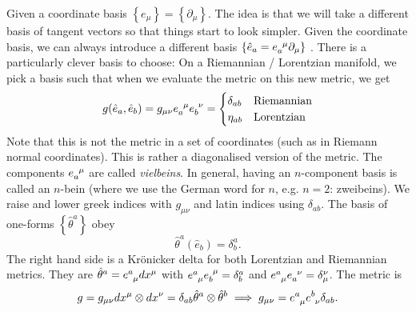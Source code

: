 Given a coordinate basis $\left\{ e_{\mu} \right\} = \left\{ \partial_{\mu} \right\}$.
The idea is that we will take a different basis of tangent vectors so that things start to look simpler.
Given the coordinate basis, we can always introduce a different basis $\left\{ \hat e_a = e \indices{_a^{\mu}} \partial_{\mu} \right\}$ .
There is a particularly clever basis to choose:
On a Riemannian / Lorentzian manifold, we pick a basis such that when we evaluate the metric on this new metric, we get
\begin{equation}
  g(\hat e_a, \hat e_b) = g_{\mu\nu} e\indices{_a^{\mu}} e \indices{_b^{\nu}} =
  \begin{cases}
    \delta_{ab} & \text{Riemannian} \\
    \eta_{ab} & \text{Lorentzian}
  \end{cases}
\end{equation}
Note that this is not the metric in a set of coordinates (such as in Riemann normal coordinates). This is rather a diagonalised version of the metric.
The components $e \indices{_a^{\mu}}$ are called \emph{vielbeins}.
In general, having an $n$-component basis is called an $n$-bein (where we use the German word for $n$, e.g. $n=2$: zweibeins).
We raise and lower greek indices with $g_{\mu\nu}$ and latin indices using $\delta_{ab}$.
The basis of one-forms $\left\{ \hat\theta^a \right\}$ obey 
\begin{equation}
  \hat \theta^a (\hat e_b) = \delta^a_b.
\end{equation}
The right hand side is a Krönicker delta for both Lorentzian and Riemannian metrics.
They are $\hat \theta^a = e \indices{^a_{\mu}} dx^{\mu}$ with $e \indices{^a_{\mu}} e \indices{_b^{\mu}} = \delta^a_b$ and $e \indices{^a_{\mu}} e \indices{_a^{\nu}} = \delta^{\nu}_{\mu}$. The metric is
\begin{equation}
  g = g_{\mu\nu} dx^{\mu} \otimes dx^{\nu} = \delta_{ab} \hat \theta^a \otimes \hat\theta^b \implies g_{\mu\nu} = e \indices{^a_{\mu}} e \indices{^b_{\nu}} \delta_{ab}.
\end{equation}

